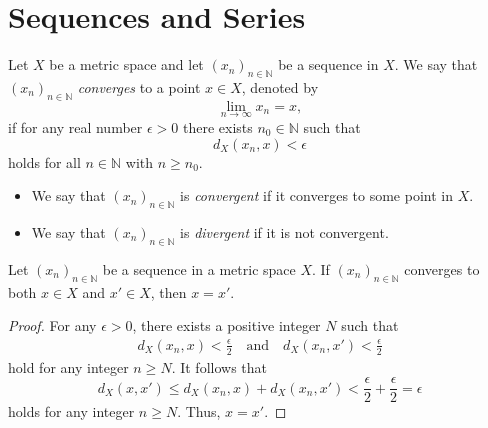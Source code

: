 \chapter{Sequences and Series}
\begin{definition}
  Let $X$ be a metric space and let $(x_n)_{n \in \mathbb{N}}$ be a sequence in
  $X$.
  We say that $(x_n)_{n \in \mathbb{N}}$ \emph{converges} to a point $x \in X$,
  denoted by
  \begin{equation*}
    \lim_{n \to \infty} x_n = x,
  \end{equation*}
  if for any real number $\epsilon > 0$ there exists $n_0 \in \mathbb{N}$
  such that 
  \begin{equation*}
    d_X(x_n, x) < \epsilon
  \end{equation*}
  holds for all $n \in \mathbb{N}$ with $n \geq n_0$.
  \begin{itemize}
    \item We say that $(x_n)_{n \in \mathbb{N}}$ is \emph{convergent} if it
    converges to some point in $X$.
    \item We say that $(x_n)_{n \in \mathbb{N}}$ is \emph{divergent} if it is
    not convergent.
  \end{itemize}
\end{definition}

\begin{theorem}
  Let $(x_n)_{n \in \mathbb{N}}$ be a sequence in a metric space $X$.
  If $(x_n)_{n \in \mathbb{N}}$ converges to both $x \in X$ and $x' \in X$,
  then $x = x'$.
\end{theorem}
\begin{proof}
  For any $\epsilon > 0$, there exists a positive integer $N$ such that
  \begin{align*}
    d_X(x_n, x) < \frac{\epsilon}{2}
    \quad \text{and} \quad
    d_X(x_n, x') < \frac{\epsilon}{2}
  \end{align*}
  hold for any integer $n \geq N$.
  It follows that
  \begin{equation*}
    d_X(x, x')
    \leq d_X(x_n, x) + d_X(x_n, x')
    < \frac{\epsilon}{2} + \frac{\epsilon}{2}
    = \epsilon
  \end{equation*}
  holds for any integer $n \geq N$.
  Thus, $x = x'$.
\end{proof}


